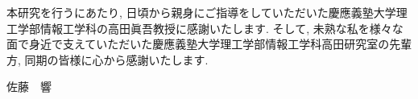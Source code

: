 \acknowledge


本研究を行うにあたり, 日頃から親身にご指導をしていただいた慶應義塾大学理工学部情報工学科の高田眞吾教授に感謝いたします.
そして, 未熟な私を様々な面で身近で支えていただいた慶應義塾大学理工学部情報工学科高田研究室の先輩方, 同期の皆様に心から感謝いたします. 


\begin{flushright}
  {\Large 佐藤　響}
\end{flushright}